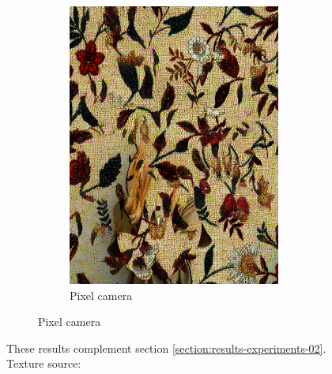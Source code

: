 \begin{figure}[]
\begin{subfigure}{\textwidth}
\begin{subfigure}{0.24\textwidth}
            \includegraphics[width=\textwidth]{images/04-experiment02/human/flowers2/pixel_proj.jpg}
            \caption*{Pixel camera}
        \end{subfigure}
    \end{subfigure}
    \caption{These results complement section \ref{section:results-experiments-02}. Texture source: \citet{Pixar128}}
    \label{fig:ex02-complete-human-flowers_flowers2}
\end{figure}

